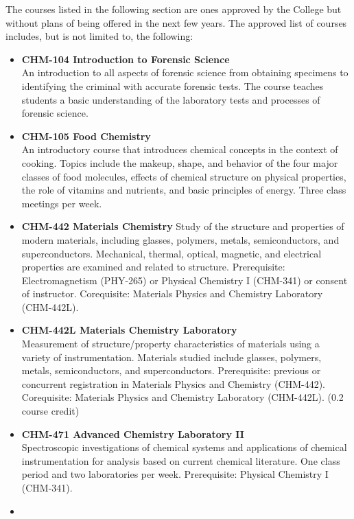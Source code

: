\documentclass[
  letterpaper,
]{scrbook}
\providecommand{\tightlist}{%
  \setlength{\itemsep}{0pt}\setlength{\parskip}{0pt}}
\begin{document}
The courses listed in the following section are ones approved by the
College but without plans of being offered in the next few years. The
approved list of courses includes, but is not limited to, the following:

\begin{itemize}
\tightlist
\item
  \textbf{CHM-104 Introduction to Forensic Science}\\
  An introduction to all aspects of forensic science from obtaining
  specimens to identifying the criminal with accurate forensic tests.
  The course teaches students a basic understanding of the laboratory
  tests and processes of forensic science.
\item
  \textbf{CHM-105 Food Chemistry}\\
  An introductory course that introduces chemical concepts in the
  context of cooking. Topics include the makeup, shape, and behavior of
  the four major classes of food molecules, effects of chemical
  structure on physical properties, the role of vitamins and nutrients,
  and basic principles of energy. Three class meetings per week.
\item
  \textbf{CHM-442 Materials Chemistry} Study of the structure and
  properties of modern materials, including glasses, polymers, metals,
  semiconductors, and superconductors. Mechanical, thermal, optical,
  magnetic, and electrical properties are examined and related to
  structure. Prerequisite: Electromagnetism (PHY-265) or Physical
  Chemistry I (CHM-341) or consent of instructor. Corequisite: Materials
  Physics and Chemistry Laboratory (CHM-442L).
\item
  \textbf{CHM-442L Materials Chemistry Laboratory}\\
  Measurement of structure/property characteristics of materials using a
  variety of instrumentation. Materials studied include glasses,
  polymers, metals, semiconductors, and superconductors. Prerequisite:
  previous or concurrent registration in Materials Physics and Chemistry
  (CHM-442). Corequisite: Materials Physics and Chemistry Laboratory
  (CHM-442L). (0.2 course credit)
\item
  \textbf{CHM-471 Advanced Chemistry Laboratory II}\\
  Spectroscopic investigations of chemical systems and applications of
  chemical instrumentation for analysis based on current chemical
  literature. One class period and two laboratories per week.
  Prerequisite: Physical Chemistry I (CHM-341).
\item

\end{itemize}
\end{document}
